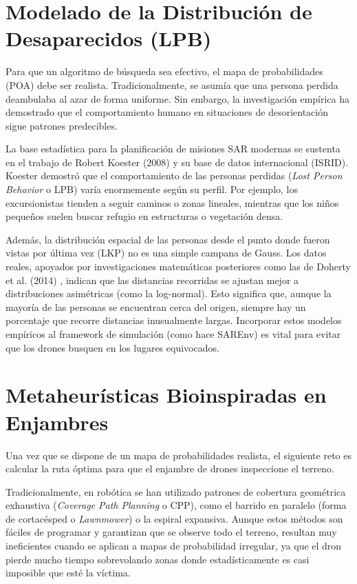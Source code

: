 \section{Modelado de la Distribución de Desaparecidos (LPB)}

Para que un algoritmo de búsqueda sea efectivo, el mapa de probabilidades (POA) debe ser realista. Tradicionalmente, se asumía que una persona perdida deambulaba al azar de forma uniforme. Sin embargo, la investigación empírica ha demostrado que el comportamiento humano en situaciones de desorientación sigue patrones predecibles.

La base estadística para la planificación de misiones SAR modernas se sustenta en el trabajo de Robert Koester (2008) \cite{koester2008} y su base de datos internacional (ISRID). Koester demostró que el comportamiento de las personas perdidas (\textit{Lost Person Behavior} o LPB) varía enormemente según su perfil. Por ejemplo, los excursionistas tienden a seguir caminos o zonas lineales, mientras que los niños pequeños suelen buscar refugio en estructuras o vegetación densa.

Además, la distribución espacial de las personas desde el punto donde fueron vistas por última vez (LKP) no es una simple campana de Gauss. Los datos reales, apoyados por investigaciones matemáticas posteriores como las de Doherty et al. (2014) \cite{doherty2014}, indican que las distancias recorridas se ajustan mejor a distribuciones asimétricas (como la log-normal). Esto significa que, aunque la mayoría de las personas se encuentran cerca del origen, siempre hay un porcentaje que recorre distancias inusualmente largas. Incorporar estos modelos empíricos al framework de simulación (como hace SAREnv) es vital para evitar que los drones busquen en los lugares equivocados.

\section{Metaheurísticas Bioinspiradas en Enjambres}

Una vez que se dispone de un mapa de probabilidades realista, el siguiente reto es calcular la ruta óptima para que el enjambre de drones inspeccione el terreno. 

Tradicionalmente, en robótica se han utilizado patrones de cobertura geométrica exhaustiva (\textit{Coverage Path Planning} o CPP), como el barrido en paralelo (forma de cortacésped o \textit{Lawnmower}) o la espiral expansiva. Aunque estos métodos son fáciles de programar y garantizan que se observe todo el terreno, resultan muy ineficientes cuando se aplican a mapas de probabilidad irregular, ya que el dron pierde mucho tiempo sobrevolando zonas donde estadísticamente es casi imposible que esté la víctima.

